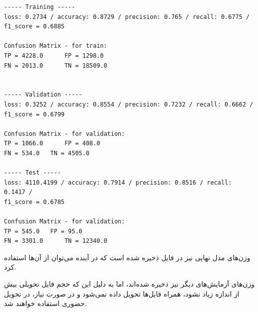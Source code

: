 \documentclass{article}
\begin{document}
\begin{latin}
\begin{lstlisting}
----- Training -----
loss: 0.2734 / accuracy: 0.8729 / precision: 0.765 / recall: 0.6775 /
f1_score = 0.6885

Confusion Matrix - for train:
TP = 4228.0 	 FP = 1298.0
FN = 2013.0 	 TN = 18509.0


----- Validation -----
loss: 0.3252 / accuracy: 0.8554 / precision: 0.7232 / recall: 0.6662 /
f1_score = 0.6799

Confusion Matrix - for validation:
TP = 1066.0 	 FP = 408.0
FN = 534.0 	 TN = 4505.0

----- Test -----
loss: 4110.4199 / accuracy: 0.7914 / precision: 0.8516 / recall: 0.1417 / 
f1_score = 0.6785

Confusion Matrix - for validation:
TP = 545.0 	 FP = 95.0
FN = 3301.0 	 TN = 12340.0
\end{lstlisting}
\end{latin}

وزن‌های مدل نهایی نیز در فایل  ذخیره شده است که در آینده می‌توان از آن‌ها استفاده کرد.

وزن‌های آزمایش‌های دیگر نیز ذخیره شده‌اند، اما به دلیل این که حجم فایل تحویلی بیش از اندازه زیاد نشود، همراه فایل‌ها تحویل داده نمی‌شود و در صورت نیاز، در تحویل حضوری استفاده خواهند شد.



\medskip

\small
\LTR 
\latin
\end{document}
